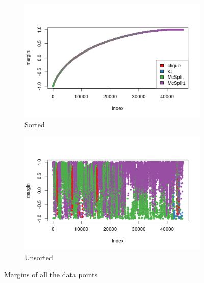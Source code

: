 \documentclass{l4proj}
\theoremstyle{definition}
\theoremstyle{remark}
\begin{document}
\begin{figure}
  \centering
  \begin{subfigure}[t]{0.49\textwidth}
    \centering
    \includegraphics[width=\textwidth]{images/unlabelled_margin.png}
    \caption{Sorted}
    \label{fig:unlabelled_margins1}
  \end{subfigure}
  \begin{subfigure}[t]{0.49\textwidth}
    \centering
    \includegraphics[width=\textwidth]{images/unlabelled_margin2.png}
    \caption{Unsorted}
    \label{fig:unlabelled_margins2}
  \end{subfigure}
  \caption{Margins of all the data points}
  \label{fig:unlabelled_margins}
\end{figure}
\end{document}
